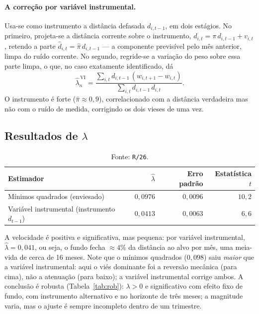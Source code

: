 \documentclass[11pt,a4paper]{article}
\begin{document}
\paragraph{A correção por variável instrumental.} Usa-se como instrumento a distância defasada
$d_{i,t-1}$, em dois estágios. No primeiro, projeta-se a distância corrente sobre o instrumento,
$d_{i,t}=\pi\,d_{i,t-1}+v_{i,t}$, retendo a parte $\widehat{d}_{i,t}=\widehat\pi\,d_{i,t-1}$ ---
a componente previsível pelo mês anterior, limpa do ruído corrente. No segundo, regride-se a
variação do peso sobre essa parte limpa, o que, no caso exatamente identificado, dá
\begin{equation}
\widehat{\lambda}^{\,\text{VI}}_n =
\frac{\sum_{i,t} d_{i,t-1}\,(w_{i,t+1}-w_{i,t})}{\sum_{i,t} d_{i,t-1}\,d_{i,t}} .
\label{eq:lambdaiv}
\end{equation}
O instrumento é forte ($\widehat\pi\approx0{,}9$), correlacionado com a distância verdadeira mas não
com o ruído de medida, corrigindo os dois vieses de uma vez.

\subsection{Resultados de $\lambda$}

\begin{table}[h]\centering\small
\caption{Velocidade de ajuste $\lambda$ na equação $\Delta w_{i,t+1}=\lambda\,d_{i,t}+u$.
Erro-padrão agrupado por fundo ($10.570$ observações).}
\label{tab:lambda}
\begin{tabular}{@{}lrrr@{}}
\toprule
Estimador & $\widehat{\lambda}$ & Erro padrão & Estatística $t$ \\
\midrule
Mínimos quadrados (enviesado)              & $0{,}0976$ & $0{,}0096$ & $10{,}2$ \\
Variável instrumental (instrumento $d_{t-1}$) & $0{,}0413$ & $0{,}0063$ & $6{,}6$  \\
\bottomrule
\end{tabular}
\caption*{\footnotesize Fonte: \texttt{R/26}.}
\end{table}

A velocidade é positiva e significativa, mas pequena: por variável instrumental,
$\widehat\lambda=0{,}041$, ou seja, o fundo fecha $\approx4\%$ da distância ao alvo por mês, uma
meia-vida de cerca de 16 meses. Note que o mínimos quadrados ($0{,}098$) saiu \emph{maior} que a
variável instrumental: aqui o viés dominante foi a reversão mecânica (para cima), não a atenuação
(para baixo); a variável instrumental corrige ambos. A conclusão é robusta (Tabela~\ref{tab:rob}):
$\lambda>0$ e significativo com efeito fixo de fundo, com instrumento alternativo e no horizonte de
três meses; a magnitude varia, mas o ajuste é sempre incompleto dentro de um trimestre.
\end{document}
